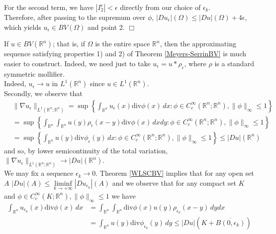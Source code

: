 For the second term, we have $|I_{2}^{\epsilon}| < \epsilon$ directly from our choice of $\epsilon_{k}$.
\\
Therefore, after passing to the supremum over $\phi$, $|Du_{\epsilon}|(\Omega) \le |Du|(\Omega) + 4 \epsilon$, which yields $u_{\epsilon} \in BV(\Omega)$ and point 2. $\Box$

\begin{remark} \label{BVR^N} If $u \in BV(\mathbb{R}^{n})$; that is, if $\Omega$ is the entire space $\mathbb{R}^{n}$, then the approximating sequence satisfying properties 1) and 2) of Theorem \ref{Meyers-SerrinBV} is much easier to construct. Indeed, we need just to take $u_{\epsilon} = u \ast \rho_{\epsilon}$, where $\rho$ is a standard symmetric mollifier.
\\
Indeed, $u_{\epsilon} \to u$ in $L^{1}(\mathbb{R}^{n})$ since $u \in L^{1}(\mathbb{R}^{n})$.
\\
Secondly, we observe that
\begin{align*} & \|\nabla u_{\epsilon}\|_{L^{1}(\mathbb{R}^{n}; \mathbb{R}^{n})} = \sup \left \{ \int_{\mathbb{R}^{n}} u_{\epsilon}(x) \mathrm{div}\phi(x) \, dx : \phi \in C^{\infty}_{c}(\mathbb{R}^{n}; \mathbb{R}^{n}), \|\phi\|_{\infty} \le 1 \right \} \\
& = \sup \left \{ \int_{\mathbb{R}^{n}} \int_{\mathbb{R}^{n}} u(y) \rho_{\epsilon}(x-y) \mathrm{div}\phi(x) \, dx dy : \phi \in C^{\infty}_{c}(\mathbb{R}^{n}; \mathbb{R}^{n}), \|\phi\|_{\infty} \le 1 \right \} \\
& = \sup \left \{ \int_{\mathbb{R}^{n}} u(y) \mathrm{div}\phi_{\epsilon}(y) \, dx : \phi \in C^{\infty}_{c}(\mathbb{R}^{n}; \mathbb{R}^{n}), \|\phi\|_{\infty} \le 1 \right \} \le |Du|(\mathbb{R}^{n}) \end{align*}
and so, by lower semicontinuity of the total variation, $\|\nabla u_{\epsilon}\|_{L^{1}(\mathbb{R}^{n}; \mathbb{R}^{n})} \to |Du|(\mathbb{R}^{n})$.
\\
We may fix a sequence $\epsilon_{k} \to 0$. Theorem \ref{WLSCBV} implies that for any open set $A$ $|D u|(A) \le \liminf\limits_{k \to +\infty} |D u_{\epsilon_{k}}|(A)$ and we observe that for any compact set $K$ and $\phi \in C^{\infty}_{c}(K; \mathbb{R}^{n}), \|\phi\|_{\infty} \le 1$ we have
\begin{align*} \int_{\mathbb{R}^{n}} u_{\epsilon_{k}}(x) \mathrm{div}\phi(x) \, dx & = \int_{\mathbb{R}^{n}} \int_{\mathbb{R}^{n}} \mathrm{div}\phi(x) u(y)  \rho_{\epsilon_{k}}(x - y) \, dy dx \\
& = \int_{\mathbb{R}^{n}} u(y) \mathrm{div}\phi_{\epsilon_{k}}(y) \, dy \le |D u|(K + \overline{B(0, \epsilon_{k})})

\end{align*}
\end{remark}
